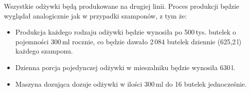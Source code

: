 Wszystkie odżywki będą produkowane na drugiej linii. Proces produkcji będzie wyglądał analogicznie jak w przypadki szamponów, z tym że:
\begin{itemize}
	\item Produkcja każdego rodzaju odżywki będzie wynosiła po 500\,tys. butelek o pojemności 300\,ml rocznie, co będzie dawało 2\,084 butelek dziennie (625,2\,l) każdego szamponu.
	\item Dzienna porcja pojedynczej odżywki w mieszalniku będzie wynosiła 630\,l.
	\item Maszyna dozująca dozuje odżywki w ilości 300\,ml do 16 butelek jednocześnie.
\end{itemize}
